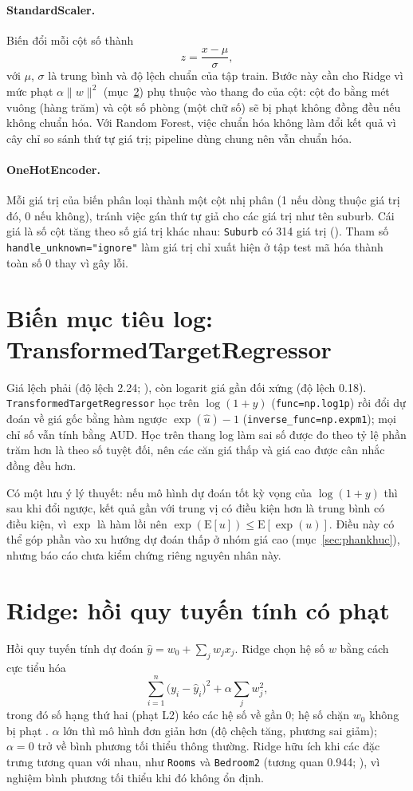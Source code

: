 \paragraph{StandardScaler.} Biến đổi mỗi cột số thành
\[ z = \frac{x - \mu}{\sigma}, \]
với $\mu$, $\sigma$ là trung bình và độ lệch chuẩn của tập train. Bước này cần cho Ridge vì mức phạt $\alpha\lVert w\rVert^2$ (mục~\ref{sec:ridge}) phụ thuộc vào thang đo của cột: cột đo bằng mét vuông (hàng trăm) và cột số phòng (một chữ số) sẽ bị phạt không đồng đều nếu không chuẩn hóa. Với Random Forest, việc chuẩn hóa không làm đổi kết quả vì cây chỉ so sánh thứ tự giá trị; pipeline dùng chung nên vẫn chuẩn hóa.

\paragraph{OneHotEncoder.} Mỗi giá trị của biến phân loại thành một cột nhị phân (1 nếu dòng thuộc giá trị đó, 0 nếu không), tránh việc gán thứ tự giả cho các giá trị như tên suburb. Cái giá là số cột tăng theo số giá trị khác nhau: \texttt{Suburb} có 314 giá trị (). Tham số \texttt{handle\_unknown="ignore"} làm giá trị chỉ xuất hiện ở tập test mã hóa thành toàn số 0 thay vì gây lỗi.

\section{Biến mục tiêu log: TransformedTargetRegressor}\label{sec:ttr}
Giá lệch phải (độ lệch 2.24; ), còn logarit giá gần đối xứng (độ lệch 0.18). \texttt{TransformedTargetRegressor} học trên $\log(1+y)$ (\texttt{func=np.log1p}) rồi đổi dự đoán về giá gốc bằng hàm ngược $\exp(\hat{u})-1$ (\texttt{inverse\_func=np.expm1}); mọi chỉ số vẫn tính bằng AUD. Học trên thang log làm sai số được đo theo tỷ lệ phần trăm hơn là theo số tuyệt đối, nên các căn giá thấp và giá cao được cân nhắc đồng đều hơn.

Có một lưu ý lý thuyết: nếu mô hình dự đoán tốt kỳ vọng của $\log(1+y)$ thì sau khi đổi ngược, kết quả gần với trung vị có điều kiện hơn là trung bình có điều kiện, vì $\exp$ là hàm lồi nên $\exp(\mathrm{E}[u]) \le \mathrm{E}[\exp(u)]$. Điều này có thể góp phần vào xu hướng dự đoán thấp ở nhóm giá cao (mục~\ref{sec:phankhuc}), nhưng báo cáo chưa kiểm chứng riêng nguyên nhân này.

\section{Ridge: hồi quy tuyến tính có phạt}\label{sec:ridge}
Hồi quy tuyến tính dự đoán $\hat{y} = w_0 + \sum_j w_j x_j$. Ridge chọn hệ số $w$ bằng cách cực tiểu hóa
\[ \sum_{i=1}^{n}\bigl(y_i - \hat{y}_i\bigr)^2 + \alpha \sum_{j} w_j^2 , \]
trong đó số hạng thứ hai (phạt L2) kéo các hệ số về gần 0; hệ số chặn $w_0$ không bị phạt \cite{hoerl1970}. $\alpha$ lớn thì mô hình đơn giản hơn (độ chệch tăng, phương sai giảm); $\alpha = 0$ trở về bình phương tối thiểu thông thường. Ridge hữu ích khi các đặc trưng tương quan với nhau, như \texttt{Rooms} và \texttt{Bedroom2} (tương quan 0.944; ), vì nghiệm bình phương tối thiểu khi đó không ổn định.

